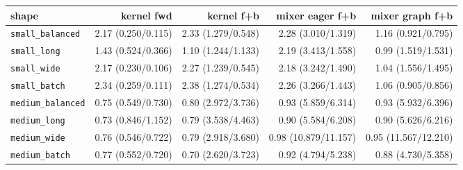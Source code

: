 \begin{tabular}{l r r r r }
\toprule
shape & kernel fwd & kernel f+b & mixer eager f+b & mixer graph f+b \\
\midrule
\texttt{small\_balanced} & 2.17 (0.250/0.115) & 2.33 (1.279/0.548) & 2.28 (3.010/1.319) & 1.16 (0.921/0.795) \\
\texttt{small\_long} & 1.43 (0.524/0.366) & 1.10 (1.244/1.133) & 2.19 (3.413/1.558) & 0.99 (1.519/1.531) \\
\texttt{small\_wide} & 2.17 (0.230/0.106) & 2.27 (1.239/0.545) & 2.18 (3.242/1.490) & 1.04 (1.556/1.495) \\
\texttt{small\_batch} & 2.34 (0.259/0.111) & 2.38 (1.274/0.534) & 2.26 (3.266/1.443) & 1.06 (0.905/0.856) \\
\texttt{medium\_balanced} & 0.75 (0.549/0.730) & 0.80 (2.972/3.736) & 0.93 (5.859/6.314) & 0.93 (5.932/6.396) \\
\texttt{medium\_long} & 0.73 (0.846/1.152) & 0.79 (3.538/4.463) & 0.90 (5.584/6.208) & 0.90 (5.626/6.216) \\
\texttt{medium\_wide} & 0.76 (0.546/0.722) & 0.79 (2.918/3.680) & 0.98 (10.879/11.157) & 0.95 (11.567/12.210) \\
\texttt{medium\_batch} & 0.77 (0.552/0.720) & 0.70 (2.620/3.723) & 0.92 (4.794/5.238) & 0.88 (4.730/5.358) \\
\bottomrule
\end{tabular}
